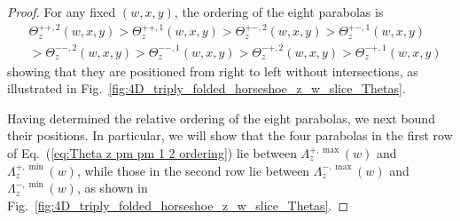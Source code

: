 \documentclass[12pt]{iopart}
\begin{document}
\begin{proof}
For any fixed \( (w,x,y) \), the ordering of the eight parabolas is  
\begin{eqnarray}
&\Theta^{++,2}_z(w,x,y) > \Theta^{++,1}_z(w,x,y) > \Theta^{+-,2}_z(w,x,y) > \Theta^{+-,1}_z(w,x,y) \nonumber \\
&> \Theta^{--,2}_z(w,x,y) > \Theta^{--,1}_z(w,x,y) > \Theta^{-+,2}_z(w,x,y) > \Theta^{-+,1}_z(w,x,y) \label{eq:Theta z pm pm 1 2 ordering}
\end{eqnarray}
showing that they are positioned from right to left without intersections, as illustrated in Fig.~\ref{fig:4D_triply_folded_horseshoe_z_w_slice_Thetas}.

Having determined the relative ordering of the eight parabolas, we next bound their positions.  
In particular, we will show that the four parabolas in the first row of Eq.~(\ref{eq:Theta z pm pm 1 2 ordering}) lie between \( \Lambda^{+,\max}_z(w) \) and \( \Lambda^{+,\min}_z(w) \), while those in the second row lie between \( \Lambda^{-,\max}_z(w) \) and \( \Lambda^{-,\min}_z(w) \), as shown in Fig.~\ref{fig:4D_triply_folded_horseshoe_z_w_slice_Thetas}.


\end{proof}
\end{document}
